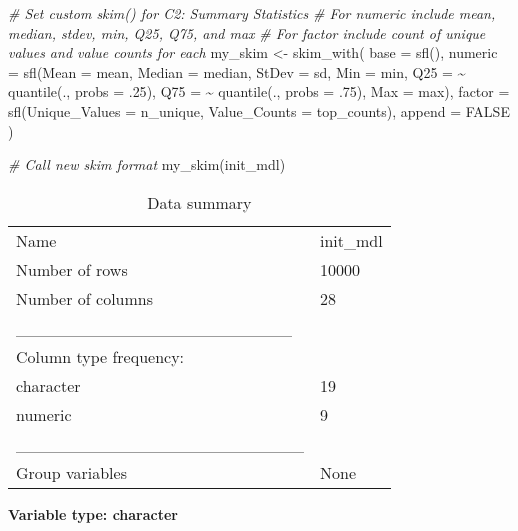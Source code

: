\documentclass[
]{article}
\newenvironment{Shaded}{\begin{snugshade}}{\end{snugshade}}
\newcommand{\AttributeTok}[1]{\textcolor[rgb]{0.77,0.63,0.00}{#1}}
\newcommand{\CommentTok}[1]{\textcolor[rgb]{0.56,0.35,0.01}{\textit{#1}}}
\newcommand{\ConstantTok}[1]{\textcolor[rgb]{0.00,0.00,0.00}{#1}}
\newcommand{\DecValTok}[1]{\textcolor[rgb]{0.00,0.00,0.81}{#1}}
\newcommand{\FunctionTok}[1]{\textcolor[rgb]{0.00,0.00,0.00}{#1}}
\newcommand{\NormalTok}[1]{#1}
\newcommand{\OtherTok}[1]{\textcolor[rgb]{0.56,0.35,0.01}{#1}}
\newcommand{\SpecialCharTok}[1]{\textcolor[rgb]{0.00,0.00,0.00}{#1}}
\begin{document}
\begin{Shaded}
\begin{Highlighting}[]
\CommentTok{\# Set custom skim() for C2: Summary Statistics}
\CommentTok{\# For numeric include mean, median, stdev, min, Q25, Q75, and max}
\CommentTok{\# For factor include count of unique values and value counts for each}
\NormalTok{my\_skim }\OtherTok{\textless{}{-}} \FunctionTok{skim\_with}\NormalTok{(}
  \AttributeTok{base =} \FunctionTok{sfl}\NormalTok{(),}
  \AttributeTok{numeric =} \FunctionTok{sfl}\NormalTok{(}\AttributeTok{Mean =}\NormalTok{ mean,}
                \AttributeTok{Median =}\NormalTok{ median,}
                \AttributeTok{StDev =}\NormalTok{ sd,}
                \AttributeTok{Min =}\NormalTok{ min,}
                \AttributeTok{Q25 =} \SpecialCharTok{\textasciitilde{}} \FunctionTok{quantile}\NormalTok{(., }\AttributeTok{probs =}\NormalTok{ .}\DecValTok{25}\NormalTok{),}
                \AttributeTok{Q75 =} \SpecialCharTok{\textasciitilde{}} \FunctionTok{quantile}\NormalTok{(., }\AttributeTok{probs =}\NormalTok{ .}\DecValTok{75}\NormalTok{),}
                \AttributeTok{Max =}\NormalTok{ max),}
  \AttributeTok{factor =} \FunctionTok{sfl}\NormalTok{(}\AttributeTok{Unique\_Values =}\NormalTok{ n\_unique,}
               \AttributeTok{Value\_Counts =}\NormalTok{ top\_counts),}
  \AttributeTok{append =} \ConstantTok{FALSE}
\NormalTok{)}

\CommentTok{\# Call new skim format}
\FunctionTok{my\_skim}\NormalTok{(init\_mdl)}
\end{Highlighting}
\end{Shaded}

\begin{longtable}[]{@{}ll@{}}
\caption{Data summary}\tabularnewline
\toprule
\endhead
Name & init\_mdl \\
Number of rows & 10000 \\
Number of columns & 28 \\
\_\_\_\_\_\_\_\_\_\_\_\_\_\_\_\_\_\_\_\_\_\_\_ & \\
Column type frequency: & \\
character & 19 \\
numeric & 9 \\
\_\_\_\_\_\_\_\_\_\_\_\_\_\_\_\_\_\_\_\_\_\_\_\_ & \\
Group variables & None \\
\bottomrule
\end{longtable}

\textbf{Variable type: character}
\end{document}

